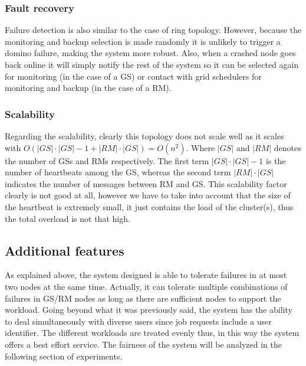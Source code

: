 \subsubsection{Fault recovery}

Failure detection is also similar to the case of ring topology. However, because the monitoring and backup selection is made randomly it is unlikely to trigger a domino failure, making the system more robust. Also, when a crashed node goes back online it will simply notify the rest of the system so it can be selected again for monitoring (in the case of a GS) or contact with grid schedulers for monitoring and backup (in the case of a RM). 

\subsubsection{Scalability}
Regarding the scalability, clearly this topology does not scale well as it scales with $O(|GS|\cdot |GS|-1 + |RM|\cdot |GS|) = O(n^2)$. Where $|GS|$ and $|RM|$ denotes the number of GSs and RMs respectively. The first term $|GS|\cdot |GS|-1$ is the number of heartbeats among the GS, whereas the second term $|RM|\cdot |GS|$ indicates the number of messages between RM and GS. This scalability factor clearly is not good at all, however we have to take into account that the size of the heartbeat is extremely small, it just contains the load of the cluster(s), thus the total overload is not that high.

\subsection{Additional features}

As explained above, the system designed is able to tolerate failures in at most two nodes at the same time. Actually, it can tolerate multiple combinations of failures in GS/RM nodes as long as there are sufficient nodes to support the workload. Going beyond what it was previously said, the system has the ability to deal simultaneously with diverse users since job requests include a user identifier. The different workloads are treated evenly thus, in this way the system offers a best effort service. The fairness of the system will be analyzed in the following section of experiments.

